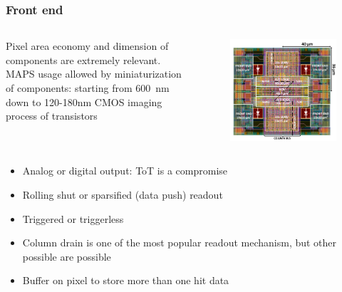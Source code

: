     \begin{frame}
        \frametitle{Front end}
            \begin{columns}
                Pixel area economy and dimension of components are extremely relevant. MAPS usage allowed by miniaturization of components: starting from \SI{600}{nm} down to 120-180{nm} CMOS imaging process of transistors
                    \begin{figure}[h!]
                        \centering
                        \includegraphics[width=0.99\linewidth]{figures/Monopix1/Monopix1_2x2pixelsgroup.png}
                    \end{figure}
            \end{columns}


        \begin{itemize}
            \item Analog or digital output: ToT is a compromise
            \item Rolling shut or sparsified (data push) readout 
            \item Triggered or triggerless
            \item Column drain is one of the most popular readout mechanism, but other possible are possible
            \item Buffer on pixel to store more than one hit data
        \end{itemize}
 
    \end{frame} 